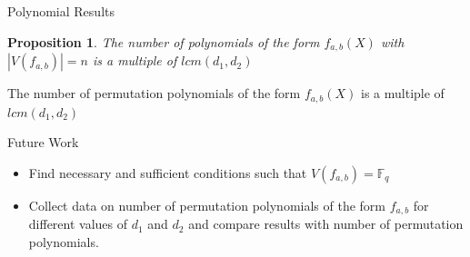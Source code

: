 \documentclass{beamer}
\newtheorem{proposition}{Proposition}
\begin{document}
\begin{frame}{Polynomial Results}
    \begin{proposition}
    The number of polynomials of the form $f_{a, b}(X)$ with $|V(f_{a, b})| = n$ is a multiple of $lcm(d_1, d_2)$
  \end{proposition}

  \begin{corollary}
    The number of permutation polynomials of the form $f_{a, b}(X)$ is a multiple of $lcm(d_1, d_2)$
  \end{corollary}
\end{frame}



    




\begin{frame}{Future Work}
  \begin{itemize}
    \item Find necessary and sufficient conditions such that $V(f_{a,b}) = \mathbb{F}_q$
    \item Collect data on number of permutation polynomials of the form $f_{a,b}$ for different values of $d_1$ and $d_2$ and compare results with number of permutation polynomials.
  \end{itemize}
\end{frame}

\end{document}
